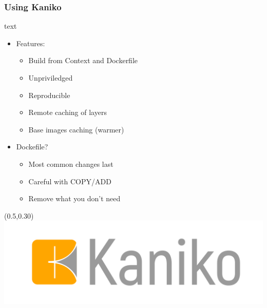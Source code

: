 \documentclass[aspectratio=169,11pt,hyperref={colorlinks=true}]{beamer}
\begin{document}
\begin{lblackrwhiteframe}
\begin{lblackrwhiteframe}
\begin{blackframe}
\begin{lblackrwhiteframe}
  \frametitle{Using Kaniko}
  \large
  \begin{beamercolorbox}[wd=0.45\paperwidth]{text}
    \begin{itemize}
      \item Features:
      \begin{itemize}
        \item Build from Context and Dockerfile
        \item Unpriviledged
        \item Reproducible
        \item Remote caching of layers
        \item Base images caching (warmer)
      \end{itemize}
    \end{itemize}
    \vspace{3ex}
    \begin{itemize}
      \item Dockefile?
      \begin{itemize}
        \item Most common changes last
        \item Careful with COPY/ADD
        \item Remove what you don't need
      \end{itemize}
    \end{itemize}
  \end{beamercolorbox}%
  \begin{textblock*}{0.5\paperwidth}(0.5\paperwidth,0.30\paperheight)
    \centering
    \includegraphics[width=0.35\paperwidth]{img/Kaniko-Logo.png}
  \end{textblock*}
\end{lblackrwhiteframe}


\end{blackframe}
\end{lblackrwhiteframe}
\end{lblackrwhiteframe}
\end{document}
